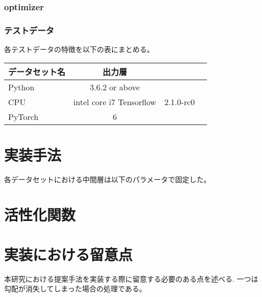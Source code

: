 \subsubsection{optimizer}
\subsubsection{テストデータ}
各テストデータの特徴を以下の表にまとめる。


\begin{tabular}{l*{2}{c}r}
データセット名      & 出力層 \\
\hline
Python            & 3.6.2 or above \\
CPU               & intel core i7
Tensorflow        & 2.1.0-rc0 \\
PyTorch           & 6 \\
\end{tabular}





\section{実装手法}

各データセットにおける中間層は以下のパラメータで固定した。


\section{活性化関数}



\section{実装における留意点}
本研究における提案手法を実装する際に留意する必要のある点を述べる.
一つは勾配が消失してしまった場合の処理である。

\section{}

